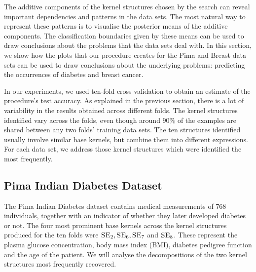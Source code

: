 \documentclass[a4paper,12pt ]{report}
\begin{document}

The additive components of the kernel structures chosen by the search can reveal important dependencies and patterns in the data sets. The most natural way to represent these patterns is to visualise the posterior means of the additive components. The classification boundaries given by these means can be used to draw conclusions about the problems that the data sets deal with. In this section, we show how the plots that our procedure creates for the Pima and Breast data sets can be used to draw conclusions about the underlying problems: predicting the occurrences of diabetes and breast cancer.

In our experiments, we used ten-fold cross validation to obtain an estimate of the procedure's test accuracy. As explained in the previous section, there is a lot of variability in the results obtained across different folds. The kernel structures identified vary across the folds, even though around 90\% of the examples are shared between any two folds' training data sets. The ten structures identified usually involve similar base kernels, but combine them into different expressions. For each data set, we address those kernel structures which were identified the most frequently.



\subsection{Pima Indian Diabetes Dataset}

The Pima Indian Diabetes dataset contains medical measurements of 768 individuals, together with an indicator of whether they later developed diabetes or not. The four most prominent base kernels across the kernel structures produced for the ten folds were $\textsc{SE}_2, \textsc{SE}_6, \textsc{SE}_7$ and $\textsc{SE}_8$. These represent the plasma glucose concentration, body mass index (BMI), diabetes pedigree function and the age of the patient. We will analyse the decompositions of the two kernel structures most frequently recovered.
\end{document}
